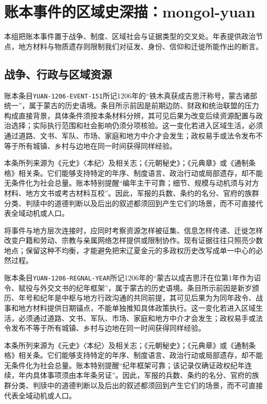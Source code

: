 \section{账本事件的区域史深描：mongol-yuan}

\label{sec:ledger-depth-mongol-yuan}

本组把账本事件置于战争、制度、区域社会与证据类型的交叉处。年表提供政治节点，地方材料与物质遗存则限制我们对征发、身份、信仰和迁徙所能作出的断言。

\subsection{战争、行政与区域资源}

账本条目\texttt{YUAN-1206-EVENT-151}所记1206年的“铁木真获成吉思汗称号，蒙古诸部统一”，属于蒙古的历史语境。条目所示前因是前期边防、财政和统治联盟的压力构成直接背景，具体条件须按本条材料分辨，其可见后果为改变后续资源配置与政治选择；实际执行范围和社会影响仍须分项核验。这一变化若进入区域生活，必须通过道路、文书、军队、市场、家庭和地方中介才会发生；政权易手或法令发布不等于所有城镇、乡村与边地在同一时间获得同样经验。

本条所列来源为《元史》〈本纪〉及相关志；《元朝秘史》；《元典章》或《通制条格》相关条。它们能够支持特定的年序、制度语言、政治行动或局部遗存，却不能无条件化为社会总量。账本特别提醒“编年主干可靠；细节、规模与动机须与对方材料、地方文书或考古材料互校”。因此，军报的兵数、条约的名分、官府的族群分类、判牍中的道德判断以及后出的叙述都须回到产生它们的场景，而不可直接代表全域动机或人口。

将事件与地方层次连接时，应同时考察资源怎样被征集、信息怎样传递、迁徙怎样改变户籍和劳动、宗教与亲属网络怎样提供或限制协作。现有证据往往只照亮少数地点；保留这种不均衡，才能避免把宋辽夏金元的多政权历史改写成单一中心的必然过程。

账本条目\texttt{YUAN-1206-REGNAL-YEAR}所记1206年的“蒙古以成吉思汗在位第1年作为诏令、赋役与外交文书的纪年框架”，属于蒙古的历史语境。条目所示前因是新岁颁历、年号和纪年是中枢与地方行政沟通的共同前提，其可见后果为为同年政令、战事和地方材料提供日期锚点，不能单独推知具体政策执行。这一变化若进入区域生活，必须通过道路、文书、军队、市场、家庭和地方中介才会发生；政权易手或法令发布不等于所有城镇、乡村与边地在同一时间获得同样经验。

本条所列来源为《元史》〈本纪〉及相关志；《元朝秘史》；《元典章》或《通制条格》相关条。它们能够支持特定的年序、制度语言、政治行动或局部遗存，却不能无条件化为社会总量。账本特别提醒“纪年框架可靠；该记录仅确证政权纪年连续，年内具体事项须由本年条另证”。因此，军报的兵数、条约的名分、官府的族群分类、判牍中的道德判断以及后出的叙述都须回到产生它们的场景，而不可直接代表全域动机或人口。

